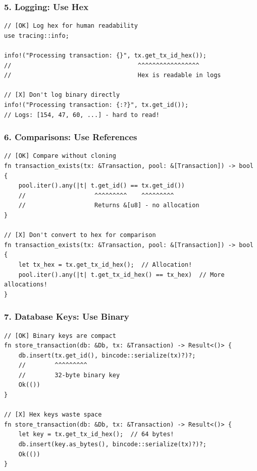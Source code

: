 \subsubsection{5. Logging: Use Hex}
\label{sec:ch06-logging}

\begin{listing}[H]
\caption{Logging best practices}
\label{lst:ch06-24}
\begin{verbatim}
// [OK] Log hex for human readability
use tracing::info;

info!("Processing transaction: {}", tx.get_tx_id_hex());
//                                   ^^^^^^^^^^^^^^^^^
//                                   Hex is readable in logs

// [X] Don't log binary directly
info!("Processing transaction: {:?}", tx.get_id());
// Logs: [154, 47, 60, ...] - hard to read!
\end{verbatim}
\end{listing}

\needspace{2in}
\subsubsection{6. Comparisons: Use References}
\label{sec:ch06-comparisons}

\begin{listing}[H]
\caption{Comparison best practices}
\label{lst:ch06-25}
\begin{verbatim}
// [OK] Compare without cloning
fn transaction_exists(tx: &Transaction, pool: &[Transaction]) -> bool {
    pool.iter().any(|t| t.get_id() == tx.get_id())
    //                   ^^^^^^^^^    ^^^^^^^^^
    //                   Returns &[u8] - no allocation
}

// [X] Don't convert to hex for comparison
fn transaction_exists(tx: &Transaction, pool: &[Transaction]) -> bool {
    let tx_hex = tx.get_tx_id_hex();  // Allocation!
    pool.iter().any(|t| t.get_tx_id_hex() == tx_hex)  // More allocations!
}
\end{verbatim}
\end{listing}

\subsubsection{7. Database Keys: Use Binary}
\label{sec:ch06-database-keys-best}

\begin{listing}[H]
\caption{Database key best practices}
\label{lst:ch06-26}
\begin{verbatim}
// [OK] Binary keys are compact
fn store_transaction(db: &Db, tx: &Transaction) -> Result<()> {
    db.insert(tx.get_id(), bincode::serialize(tx)?)?;
    //        ^^^^^^^^^
    //        32-byte binary key
    Ok(())
}

// [X] Hex keys waste space
fn store_transaction(db: &Db, tx: &Transaction) -> Result<()> {
    let key = tx.get_tx_id_hex();  // 64 bytes!
    db.insert(key.as_bytes(), bincode::serialize(tx)?)?;
    Ok(())
}
\end{verbatim}
\end{listing}

